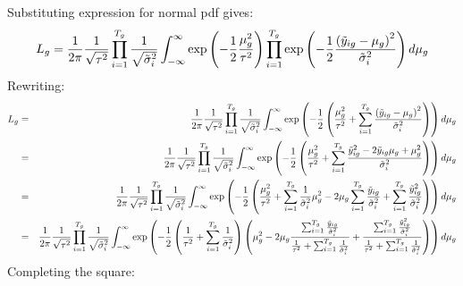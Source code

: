 \documentclass[12pt]{article}
\begin{document}
Substituting expression for normal pdf gives:%
\[
L_{g}=\frac{1}{2\pi }\frac{1}{\sqrt{\tau ^{2}}}\prod_{i=1}^{T_{g}}\frac{1}{%
\sqrt{\tilde{\sigma}_{i}^{2}}}\int_{-\infty }^{\infty }\exp \left( -\frac{1}{%
2}\frac{\mu _{g}^{2}}{\tau ^{2}}\right) \prod_{i=1}^{T_{g}}\exp \left( -%
\frac{1}{2}\frac{\left( \tilde{y}_{ig}-\mu _{g}\right) ^{2}}{\tilde{\sigma}%
_{i}^{2}}\right) d\mu _{g} 
\]%
Rewriting:%
\begin{eqnarray*}
L_{g} &=&\frac{1}{2\pi }\frac{1}{\sqrt{\tau ^{2}}}\prod_{i=1}^{T_{g}}\frac{1%
}{\sqrt{\tilde{\sigma}_{i}^{2}}}\int_{-\infty }^{\infty }\exp \left( -\frac{1%
}{2}\left( \frac{\mu _{g}^{2}}{\tau ^{2}}+\sum_{i=1}^{T_{g}}\frac{\left( 
\tilde{y}_{ig}-\mu _{g}\right) ^{2}}{\tilde{\sigma}_{i}^{2}}\right) \right)
d\mu _{g} \\
&=&\frac{1}{2\pi }\frac{1}{\sqrt{\tau ^{2}}}\prod_{i=1}^{T_{g}}\frac{1}{%
\sqrt{\tilde{\sigma}_{i}^{2}}}\int_{-\infty }^{\infty }\exp \left( -\frac{1}{%
2}\left( \frac{\mu _{g}^{2}}{\tau ^{2}}+\sum_{i=1}^{T_{g}}\frac{\tilde{y}%
_{ig}^{2}-2\tilde{y}_{ig}\mu _{g}+\mu _{g}^{2}}{\tilde{\sigma}_{i}^{2}}%
\right) \right) d\mu _{g} \\
&=&\frac{1}{2\pi }\frac{1}{\sqrt{\tau ^{2}}}\prod_{i=1}^{T_{g}}\frac{1}{%
\sqrt{\tilde{\sigma}_{i}^{2}}}\int_{-\infty }^{\infty }\exp \left( -\frac{1}{%
2}\left( \frac{\mu _{g}^{2}}{\tau ^{2}}+\sum_{i=1}^{T_{g}}\frac{1}{\tilde{%
\sigma}_{i}^{2}}\mu _{g}^{2}-2\mu _{g}\sum_{i=1}^{T_{g}}\frac{\tilde{y}_{ig}%
}{\tilde{\sigma}_{i}^{2}}+\sum_{i=1}^{T_{g}}\frac{\tilde{y}_{ig}^{2}}{\tilde{%
\sigma}_{i}^{2}}\right) \right) d\mu _{g} \\
&=&\frac{1}{2\pi }\frac{1}{\sqrt{\tau ^{2}}}\prod_{i=1}^{T_{g}}\frac{1}{%
\sqrt{\tilde{\sigma}_{i}^{2}}}\int_{-\infty }^{\infty }\exp \left( -\frac{1}{%
2}\left( \frac{1}{\tau ^{2}}+\sum_{i=1}^{T_{g}}\frac{1}{\tilde{\sigma}%
_{i}^{2}}\right) \left( \mu _{g}^{2}-2\mu _{g}\frac{\sum_{i=1}^{T_{g}}\frac{%
\tilde{y}_{ig}}{\tilde{\sigma}_{i}^{2}}}{\frac{1}{\tau ^{2}}%
+\sum_{i=1}^{T_{g}}\frac{1}{\tilde{\sigma}_{i}^{2}}}+\frac{\sum_{i=1}^{T_{g}}%
\frac{\tilde{y}_{ig}^{2}}{\tilde{\sigma}_{i}^{2}}}{\frac{1}{\tau ^{2}}%
+\sum_{i=1}^{T_{g}}\frac{1}{\tilde{\sigma}_{i}^{2}}}\right) \right) d\mu _{g}
\end{eqnarray*}%
Completing the square:%
\end{document}
